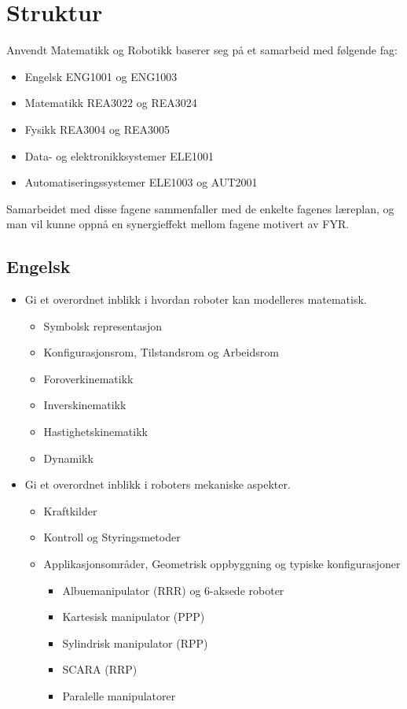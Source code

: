\section*{Struktur} \label{Sec: Struktur}

	Anvendt Matematikk og Robotikk baserer seg på et samarbeid med følgende fag:

	\begin{itemize}
	\item Engelsk ENG1001 og ENG1003
	\item Matematikk REA3022 og REA3024 %
	\item Fysikk REA3004 og REA3005
	\item Data- og elektronikksystemer ELE1001
	\item Automatiseringssystemer ELE1003 og AUT2001
	\end{itemize}

	Samarbeidet med disse fagene sammenfaller med de enkelte fagenes læreplan,
	og man vil kunne oppnå en synergieffekt mellom fagene motivert av FYR.\\


	\subsection*{Engelsk}

		\begin{itemize}

			\item Gi et overordnet inblikk i hvordan roboter kan modelleres matematisk.
				\begin{itemize}
					\item Symbolsk representasjon
					\item Konfigurasjonsrom, Tilstandsrom og Arbeidsrom
					\item Foroverkinematikk
					\item Inverskinematikk
					\item Hastighetskinematikk
					\item Dynamikk
				\end{itemize}
			\item Gi et overordnet inblikk i roboters mekaniske aspekter.
			\begin{itemize}
				\item Kraftkilder
				\item Kontroll og Styringsmetoder
				\item Applikasjonsområder, Geometrisk oppbyggning og typiske konfigurasjoner
					\begin{itemize}
						\item Albuemanipulator (RRR) og 6-aksede roboter
						\item Kartesisk manipulator (PPP)
						\item Sylindrisk manipulator (RPP)
						\item SCARA (RRP)
						\item Paralelle manipulatorer
					\end{itemize}
			\end{itemize}
		\end{itemize}


